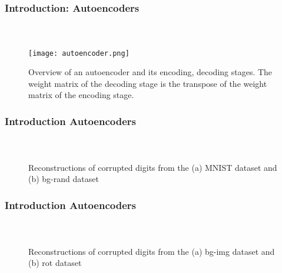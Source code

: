 
\begin{frame}[t]
	\frametitle{Introduction: Autoencoders}
	\framesubtitle{~~}  %

\begin{figure}[h]
	\centering
	\texttt{[image: autoencoder.png]}
	\caption{Overview of an autoencoder and its encoding, decoding stages. The weight matrix of the decoding stage is the transpose of the weight matrix of the encoding stage.}
	\label{fig:autoencoder}
\end{figure}


\end{frame}
\begin{frame}[t]
	\frametitle{Introduction Autoencoders}
	\framesubtitle{~~}  %

\begin{figure}
  \centering
  \caption{Reconstructions of corrupted digits from the (a) MNIST dataset and  (b) bg-rand dataset}
  \label{fig:reconstruct}
\end{figure}

\end{frame}


\begin{frame}[t]
	\frametitle{Introduction Autoencoders}
	\framesubtitle{~~}  %

\begin{figure}
  \centering
  \caption{Reconstructions of corrupted digits from the (a) bg-img dataset and (b) rot dataset}
  \label{fig:reconstruct}
\end{figure}

\end{frame}


